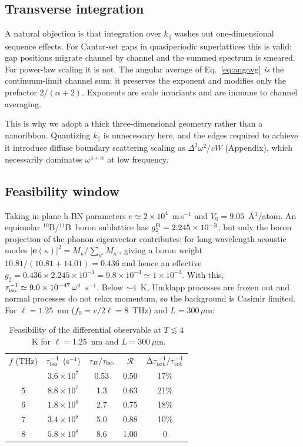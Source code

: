 \documentclass[
  aps,
  prl,
  reprint,
  amsmath,
  amssymb,
  superscriptaddress,
  floatfix,
  nofootinbib
]{revtex4-2}
\newcommand{\tenB}{$^{10}$B}
\newcommand{\elevenB}{$^{11}$B}
\begin{document}
\subsection{Transverse integration}

A natural objection is that integration over $k_\parallel$ washes out
one-dimensional sequence effects. For Cantor-set gaps in quasiperiodic
superlattices this is valid: gap positions migrate channel by channel and the
summed spectrum is smeared. For power-law scaling it is not. The angular
average of Eq.~\eqref{eq:angavg} \emph{is} the continuum-limit channel sum; it
preserves the exponent and modifies only the prefactor $2/(\alpha+2)$.
Exponents are scale invariants and are immune to channel averaging.

This is why we adopt a thick three-dimensional geometry rather than a
nanoribbon. Quantizing $k_\parallel$ is unnecessary here, and the edges
required to achieve it introduce diffuse boundary scattering scaling as
$\Delta^{2}\omega^{2}/vW$ (Appendix), which necessarily dominates
$\omega^{4+\alpha}$ at low frequency.

\subsection{Feasibility window}
\label{sec:feasibility}

Taking in-plane h-BN parameters $v\simeq2\times10^{4}$~m\,s$^{-1}$ and
$V_0=9.05$~\AA$^{3}$/atom. An equimolar \tenB/\elevenB\ boron sublattice has
$g_2^{\rm B}=2.245\times10^{-3}$, but only the boron projection of the phonon
eigenvector contributes: for long-wavelength acoustic modes
$|\bm e(\kappa)|^{2}=M_\kappa/\sum_{\kappa'}M_{\kappa'}$, giving a boron weight
$10.81/(10.81+14.01)=0.436$ and hence an effective
$g_2=0.436\times2.245\times10^{-3}=9.8\times10^{-4}\simeq1\times10^{-3}$.
With this,
$\tau_{\rm iso}^{-1}\simeq9.0\times10^{-47}\,\omega^{4}$~s$^{-1}$. Below
$\sim4$~K, Umklapp processes are frozen out and normal processes do not relax
momentum, so the background is Casimir limited. For $\ell=1.25$~nm
($f_0=v/2\ell=8$~THz) and $L=300\,\mu$m:

\begin{table}[t]
\caption{Feasibility of the differential observable at $T\lesssim4$~K for
$\ell=1.25$~nm and $L=300\,\mu$m.}
\label{tab:window}
\begin{ruledtabular}
\begin{tabular}{ccccc}
$f$ (THz) & $\tau_{\rm iso}^{-1}$ (s$^{-1}$) & $\tau_B/\tau_{\rm iso}$ &
$\mathcal{R}$ & $\Delta\tau_{\rm tot}^{-1}/\tau_{\rm tot}^{-1}$ \\
\colrule
4 & $3.6\times10^{7}$ & 0.53 & 0.50 & 17\% \\
5 & $8.8\times10^{7}$ & 1.3  & 0.63 & 21\% \\
6 & $1.8\times10^{8}$ & 2.7  & 0.75 & 18\% \\
7 & $3.4\times10^{8}$ & 5.0  & 0.88 & 10\% \\
8 & $5.8\times10^{8}$ & 8.6  & 1.00 & 0    \\
\end{tabular}
\end{ruledtabular}
\end{table}
\end{document}
